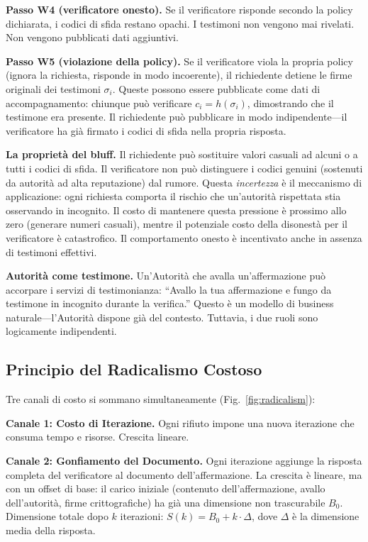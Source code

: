 \documentclass[11pt,a4paper,twocolumn]{article}
\begin{document}
\textbf{Passo W4 (verificatore onesto).} Se il verificatore risponde secondo la policy dichiarata, i codici di sfida restano opachi. I testimoni non vengono mai rivelati. Non vengono pubblicati dati aggiuntivi.

\textbf{Passo W5 (violazione della policy).} Se il verificatore viola la propria policy (ignora la richiesta, risponde in modo incoerente), il richiedente detiene le firme originali dei testimoni $\sigma_i$. Queste possono essere pubblicate come dati di accompagnamento: chiunque può verificare $c_i = h(\sigma_i)$, dimostrando che il testimone era presente. Il richiedente può pubblicare in modo indipendente---il verificatore ha già firmato i codici di sfida nella propria risposta.

\textbf{La proprietà del bluff.} Il richiedente può sostituire valori casuali ad alcuni o a tutti i codici di sfida. Il verificatore non può distinguere i codici genuini (sostenuti da autorità ad alta reputazione) dal rumore. Questa \emph{incertezza} è il meccanismo di applicazione: ogni richiesta comporta il rischio che un'autorità rispettata stia osservando in incognito. Il costo di mantenere questa pressione è prossimo allo zero (generare numeri casuali), mentre il potenziale costo della disonestà per il verificatore è catastrofico. Il comportamento onesto è incentivato anche in assenza di testimoni effettivi.

\textbf{Autorità come testimone.} Un'Autorità che avalla un'affermazione può accorpare i servizi di testimonianza: ``Avallo la tua affermazione e fungo da testimone in incognito durante la verifica.'' Questo è un modello di business naturale---l'Autorità dispone già del contesto. Tuttavia, i due ruoli sono logicamente indipendenti.

\subsection{Principio del Radicalismo Costoso}

Tre canali di costo si sommano simultaneamente (Fig.~\ref{fig:radicalism}):

\textbf{Canale 1: Costo di Iterazione.} Ogni rifiuto impone una nuova iterazione che consuma tempo e risorse. Crescita lineare.

\textbf{Canale 2: Gonfiamento del Documento.} Ogni iterazione aggiunge la risposta completa del verificatore al documento dell'affermazione. La crescita è lineare, ma con un offset di base: il carico iniziale (contenuto dell'affermazione, avallo dell'autorità, firme crittografiche) ha già una dimensione non trascurabile $B_0$. Dimensione totale dopo $k$ iterazioni: $S(k) = B_0 + k \cdot \Delta$, dove $\Delta$ è la dimensione media della risposta.
\end{document}
